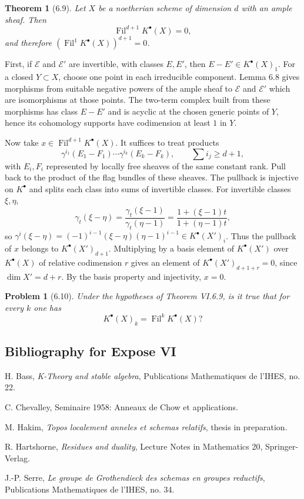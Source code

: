 \documentclass[13pt]{extarticle}
\newcommand{\Fil}{\operatorname{Fil}}
\newtheorem*{theorem}{Theorem}
\newtheorem*{problem}{Problem}
\begin{document}
\begin{theorem}[6.9]\label{thm:VI.6.9}
Let $X$ be a noetherian scheme of dimension $d$ with an ample sheaf. Then
\[
\Fil^{d+1}K^{\bullet}(X)=0,
\]
and therefore $(\Fil^1K^{\bullet}(X))^{d+1}=0$.
\end{theorem}

First, if $\mathcal E$ and $\mathcal E'$ are invertible, with classes $E,E'$, then $E-E'\in K^{\bullet}(X)_1$. For a closed $Y\subset X$, choose one point in each irreducible component. Lemma 6.8 gives morphisms from suitable negative powers of the ample sheaf to $\mathcal E$ and $\mathcal E'$ which are isomorphisms at those points. The two-term complex built from these morphisms has class $E-E'$ and is acyclic at the chosen generic points of $Y$, hence its cohomology supports have codimension at least $1$ in $Y$.

Now take $x\in\Fil^{d+1}K^{\bullet}(X)$. It suffices to treat products
\[
\gamma^{i_1}(E_1-F_1)\cdots\gamma^{i_k}(E_k-F_k),
\qquad
\sum i_j\geq d+1,
\]
with $E_i,F_i$ represented by locally free sheaves of the same constant rank. Pull back to the product of the flag bundles of these sheaves. The pullback is injective on $K^{\bullet}$ and splits each class into sums of invertible classes. For invertible classes $\xi,\eta$,
\[
\gamma_t(\xi-\eta)=\frac{\gamma_t(\xi-1)}{\gamma_t(\eta-1)}=\frac{1+(\xi-1)t}{1+(\eta-1)t},
\]
so $\gamma^i(\xi-\eta)=(-1)^{i-1}(\xi-\eta)(\eta-1)^{i-1}\in K^{\bullet}(X')_i$. Thus the pullback of $x$ belongs to $K^{\bullet}(X')_{d+1}$. Multiplying by a basis element of $K^{\bullet}(X')$ over $K^{\bullet}(X)$ of relative codimension $r$ gives an element of $K^{\bullet}(X')_{d+1+r}=0$, since $\dim X'=d+r$. By the basis property and injectivity, $x=0$.

\begin{problem}[6.10]
Under the hypotheses of Theorem VI.6.9, is it true that for every $k$ one has
\[
K^{\bullet}(X)_k=\Fil^kK^{\bullet}(X)?
\]
\end{problem}

\subsection*{Bibliography for Expose VI}
\begin{enumerate}[label={[\arabic*]}]
\item H. Bass, \emph{K-Theory and stable algebra}, Publications Mathematiques de l'IHES, no. 22.
\item C. Chevalley, Seminaire 1958: Anneaux de Chow et applications.
\item M. Hakim, \emph{Topos localement anneles et schemas relatifs}, thesis in preparation.
\item R. Hartshorne, \emph{Residues and duality}, Lecture Notes in Mathematics 20, Springer-Verlag.
\item J.-P. Serre, \emph{Le groupe de Grothendieck des schemas en groupes reductifs}, Publications Mathematiques de l'IHES, no. 34.
\end{enumerate}
\end{document}
